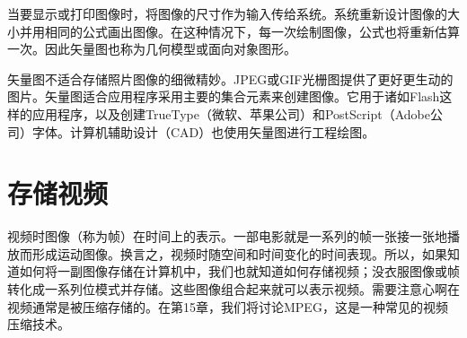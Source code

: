 当要显示或打印图像时，将图像的尺寸作为输入传给系统。系统重新设计图像的大小并用相同的公式画出图像。在这种情况下，每一次绘制图像，公式也将重新估算一次。因此矢量图也称为几何模型或面向对象图形。

矢量图不适合存储照片图像的细微精妙。JPEG或GIF光栅图提供了更好更生动的图片。矢量图适合应用程序采用主要的集合元素来创建图像。它用于诸如Flash这样的应用程序，以及创建TrueType（微软、苹果公司）和PostScript（Adobe公司）字体。计算机辅助设计（CAD）也使用矢量图进行工程绘图。
\section{存储视频}
视频时图像（称为帧）在时间上的表示。一部电影就是一系列的帧一张接一张地播放而形成运动图像。换言之，视频时随空间和时间变化的时间表现。所以，如果知道如何将一副图像存储在计算机中，我们也就知道如何存储视频；没衣服图像或帧转化成一系列位模式并存储。这些图像组合起来就可以表示视频。需要注意心啊在视频通常是被压缩存储的。在第15章，我们将讨论MPEG，这是一种常见的视频压缩技术。
